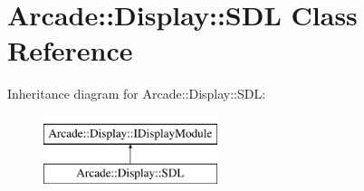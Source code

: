 \hypertarget{classArcade_1_1Display_1_1SDL}{}\section{Arcade\+::Display\+::S\+DL Class Reference}
\label{classArcade_1_1Display_1_1SDL}
Inheritance diagram for Arcade\+::Display\+::S\+DL\+:\begin{figure}[H]
\begin{center}
\leavevmode
\includegraphics[height=2.000000cm]{classArcade_1_1Display_1_1SDL}
\end{center}
\end{figure}
